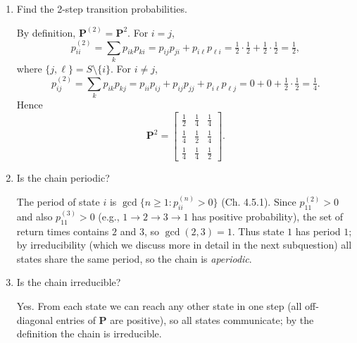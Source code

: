 \documentclass[dvipsnames,11pt]{article}
\begin{document}
    \begin{enumerate}[label=\alph*.]
        \item Find the 2-step transition probabilities.
    
            \begin{solution}
    
                By definition, $\mathbf{P}^{(2)}=\mathbf{P}^2$. For $i=j$,
                \[
                p^{(2)}_{ii}=\sum_{k}p_{ik}p_{ki}
                = p_{ij}p_{ji}+p_{i\ell}p_{\ell i}
                = \tfrac12\cdot\tfrac12+\tfrac12\cdot\tfrac12=\tfrac12,
                \]
                where $\{j,\ell\}=S\setminus\{i\}$. For $i\neq j$,
                \[
                p^{(2)}_{ij}=\sum_{k}p_{ik}p_{kj}
                = p_{ii}p_{ij}+p_{ij}p_{jj}+p_{i\ell}p_{\ell j}
                = 0 + 0 + \tfrac12\cdot\tfrac12=\tfrac14.
                \]
                Hence
                \[
                \mathbf{P}^2=\begin{bmatrix}
                \tfrac12 & \tfrac14 & \tfrac14\\
                \tfrac14 & \tfrac12 & \tfrac14\\
                \tfrac14 & \tfrac14 & \tfrac12
                \end{bmatrix}.
                \]
                
            \end{solution}
            
        \item Is the chain periodic?
    
            \begin{solution}
    
                The period of state $i$ is $\gcd\{n\ge 1: p^{(n)}_{ii}>0\}$ (Ch. 4.5.1). Since $p^{(2)}_{11}>0$ and also $p^{(3)}_{11}>0$ (e.g., $1\to 2\to 3\to 1$ has positive probability), the set of return times contains $2$ and $3$, so $\gcd(2,3)=1$. Thus state $1$ has period $1$; by irreducibility (which we discuss more in detail in the next subquestion) all states share the same period, so the chain is \emph{aperiodic}.
                
            \end{solution}
            
        \item Is the chain irreducible?
    
            \begin{solution}
    
                Yes. From each state we can reach any other state in one step (all off-diagonal entries of $\mathbf{P}$ are positive), so all states communicate; by the definition the chain is irreducible.
                

\end{solution}
\end{enumerate}
\end{document}
